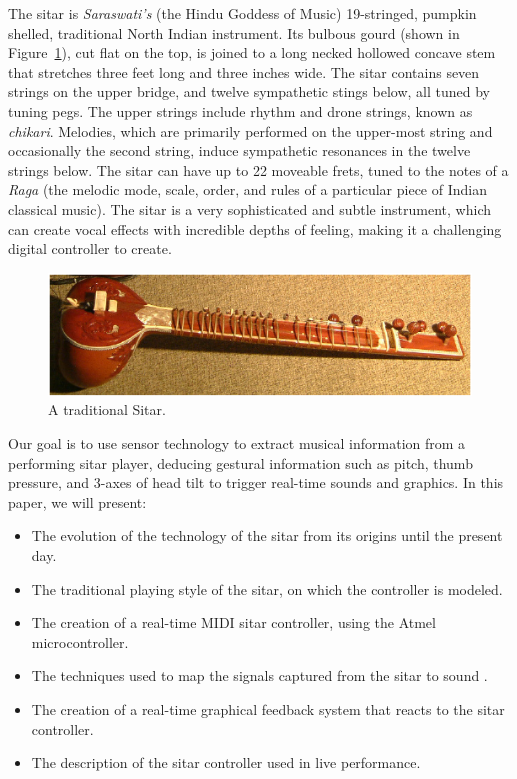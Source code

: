 The sitar is \textit{Saraswati's} (the Hindu Goddess of Music) 19-stringed,
pumpkin shelled, traditional North Indian instrument. Its bulbous gourd (shown in
Figure~\ref{Kapur:img-4}), cut flat on the top, is joined to a long necked hollowed concave stem
that stretches three feet long and three inches wide. The sitar contains seven
strings on the upper bridge, and twelve sympathetic stings below, all tuned by
tuning pegs. The upper strings include rhythm and drone strings, known as
\textit{chikari}. Melodies, which are primarily performed on the upper-most
string and occasionally the second string, induce sympathetic resonances in the
twelve strings below. The sitar can have up to 22 moveable frets, tuned to the
notes of a \textit{Raga} (the melodic mode, scale, order, and rules of a
particular piece of Indian classical music). The sitar is a very sophisticated
and subtle instrument, which can create vocal effects with incredible depths of
feeling, making it a challenging digital controller to create. \cite{Menon:1974,Vir:1998}


\begin{figure}[t]
\centering
\includegraphics[width=\textwidth]{img-4-eps-converted-to-crop.pdf}      
\caption{A traditional Sitar.}
\label{Kapur:img-4}       %
\end{figure}

Our goal is to use sensor technology to extract musical information from a
performing sitar player, deducing gestural information such as pitch, thumb
pressure, and 3-axes of head tilt to trigger real-time sounds and graphics. In
this paper, we will present:

\begin{itemize}
	\item The evolution of the technology of the sitar from its origins until the present
day.
	\item The traditional playing style of the sitar, on which the controller is modeled.
	\item The creation of a real-time MIDI sitar
controller, using the Atmel microcontroller.
	\item The techniques used to map the signals captured from the sitar to sound{\large
.}
	\item The creation of a real-time graphical feedback system that reacts to the sitar
controller.
	\item The description of the sitar controller used in live performance.
\end{itemize}




